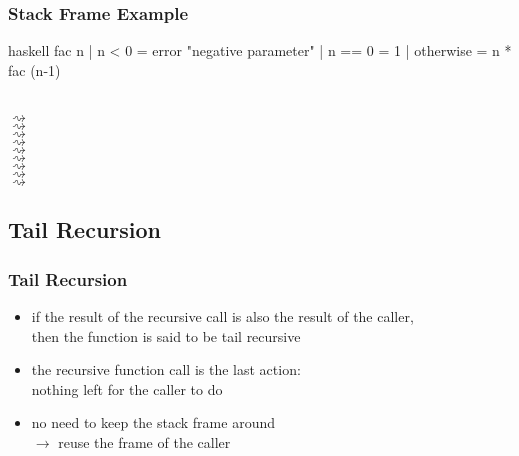 \documentclass[dvipsnames]{beamer}
\theoremstyle{plain}
\begin{document}
\begin{frame}[fragile]
  \frametitle{Stack Frame Example}

  \begin{exampleblock}{}
    \begin{pygments}{haskell}
fac n
  | n < 0     = error "negative parameter"
  | n == 0    = 1
  | otherwise = n * fac (n-1)
    \end{pygments}

    \\
    $\rightsquigarrow$ \\
    \hspace{38pt}$\rightsquigarrow$ \\
    \hspace{76pt}$\rightsquigarrow$ \\
    \hspace{114pt}$\rightsquigarrow$ \\
    \hspace{152pt}$\rightsquigarrow$ \\
    \hspace{114pt}$\rightsquigarrow$ \\
    \hspace{76pt}$\rightsquigarrow$ \\
    \hspace{38pt}$\rightsquigarrow$ \\
    $\rightsquigarrow$ \\
  \end{exampleblock}
\end{frame}

\subsection{Tail Recursion}

\begin{frame}
  \frametitle{Tail Recursion}

  \begin{itemize}
    \item if the result of the recursive call is also the result of the caller,\\
      then the function is said to be \alert{tail recursive}
    \item the recursive function call is the last action:\\
      nothing left for the caller to do

    \pause
    \medskip
    \item no need to keep the stack frame around\\
      $\rightarrow$ reuse the frame of the caller
  \end{itemize}
\end{frame}
\end{document}
